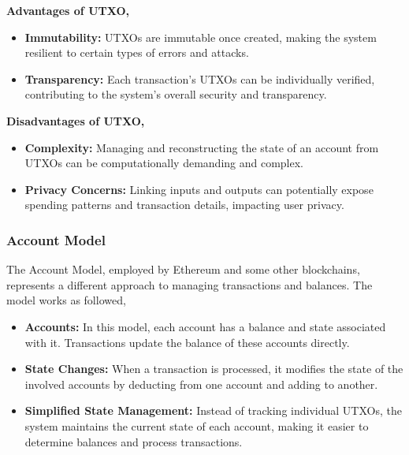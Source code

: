 \documentclass[10pt,a4paper,twocolumn]{article}
\begin{document}
\textbf{Advantages of UTXO,}\\
\begin{itemize}
\item \textbf{Immutability:} UTXOs are immutable once created, making the system resilient to certain types of errors and attacks.\\ 

\item \textbf{Transparency:} Each transaction’s UTXOs can be individually verified, contributing to the system's overall security and transparency.\\
\end{itemize}
\textbf{Disadvantages of UTXO,}\\ 
\begin{itemize}
\item \textbf{Complexity:} Managing and reconstructing the state of an account from UTXOs can be computationally demanding and complex.\\ 

\item \textbf{Privacy Concerns:} Linking inputs and outputs can potentially expose spending patterns and transaction details, impacting user privacy.\\
\end{itemize}

\subsubsection{Account Model}

The Account Model, employed by Ethereum and some other blockchains, represents a different approach to managing transactions and balances. The model works as followed,\\

\begin{itemize}
    \item \textbf{Accounts:} In this model, each account has a balance and state associated with it. Transactions update the balance of these accounts directly.\\
    
    \item \textbf{State Changes:} When a transaction is processed, it modifies the state of the involved accounts by deducting from one account and adding to another.\\
    
    \item \textbf{Simplified State Management:} Instead of tracking individual UTXOs, the system maintains the current state of each account, making it easier to determine balances and process transactions.\\
\end{itemize}
\end{document}

